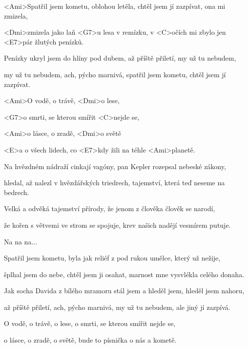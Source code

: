 

\zs
<Ami>Spatřil jsem kometu, oblohou letěla,
chtěl jsem jí zazpívat, ona mi zmizela,

<Dmi>zmizela jako laň <G7>u lesa v remízku,
v <C>očích mi zbylo jen <E7>pár žlutých penízků.
\ks

\zs
Penízky ukryl jsem do hlíny pod dubem,
až příště přiletí, my už tu nebudem,

my už tu nebudem, ach, pýcho marnivá,
spatřil jsem kometu, chtěl jsem jí zazpívat.
\ks

\zr
<Ami>O vodě, o trávě, <Dmi>o lese,

<G7>o smrti, se kterou smířit <C>nejde se,

<Ami>o lásce, o zradě, <Dmi>o světě

<E>a o všech lidech, co <E7>kdy žili na téhle <Ami>planetě.
\kr

\zs
Na hvězdném nádraží cinkají vagóny,
pan Kepler rozepsal nebeské zákony,

hledal, až nalezl v hvězdářských triedrech,
tajemství, která teď neseme na bedrech.
\ks

\zs
Velká a odvěká tajemství přírody,
že jenom z člověka člověk se narodí,

že kořen s větvemi ve strom se spojuje,
krev našich nadějí vesmírem putuje.
\ks

\zr
Na na na...
\kr

\zs
Spatřil jsem kometu, byla jak reliéf
z pod rukou umělce, který už nežije,

šplhal jsem do nebe, chtěl jsem ji osahat,
marnost mne vysvlékla celého donaha.
\ks

\zs
Jak socha Davida z bílého mramoru
stál jsem a hleděl jsem, hleděl jsem nahoru,

až příště přiletí, ach, pýcho marnivá,
my už tu nebudem, ale jiný jí zazpívá.
\ks

\zr
O vodě, o trávě, o lese,
o smrti, se kterou smířit nejde se,

o lásce, o zradě, o světě,
bude to písnička o nás a kometě.
\kr

\kp





